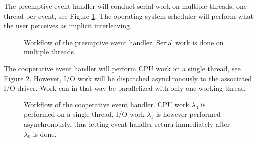 The preemptive event handler will conduct serial work on multiple threads, one
thread per event, see Figure \ref{fig:event_handler_preemptive}. The operating
system scheduler will perform what the user perceives as implicit interleaving.

\begin{figure}[h!]
    \centering

    \caption[Workflow of the preemptive event handler.]{Workflow of the
    preemptive event handler. Serial work is done on multiple threads.}

    \label{fig:event_handler_preemptive}
\end{figure}

The cooperative event handler will perform CPU work on a single thread, see
Figure \ref{fig:event_handler_cooperative}.  However, I/O work will be
dispatched asynchronously to the associated I/O driver. Work can in that way be
parallelized with only one working thread.

\begin{figure}[h!]
    \centering

    \caption[Workflow of the cooperative event handler.]{Workflow of the
    cooperative event handler. CPU work $\lambda_0$ is performed on a single
    thread, I/O work $\lambda_1$ is however performed asynchronously, thus
    letting event handler return immediately after $\lambda_0$ is done.}

    \label{fig:event_handler_cooperative}
\end{figure}

